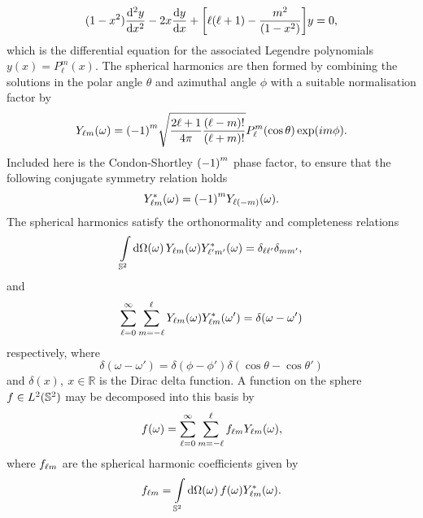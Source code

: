 %
\begin{equation}
	(1-x^{2}) \dv[2]{y}{x} - 2x\dv{y}{x} + \bigg[\ell(\ell+1) - \frac{m^{2}}{(1 - x^{2})}\bigg] y
	= 0,
\end{equation}
%
which is the differential equation for the associated Legendre polynomials \(y(x) = P^{m}_{\ell}(x)\).
The spherical harmonics are then formed by combining the solutions in the polar angle \(\theta{}\) and azimuthal angle \(\phi{}\) with a suitable normalisation factor by
%
\begin{equation}\label{eq:chapter2_spherical_harmonic}
	\pixel{\harmonic{Y}}
	= \phaseFactor \sqrt{\factor \frac{(\ell-m)!}{(\ell+m)!}} P^{m}_{\ell}(\cos{\theta}) \exp(i m\phi).
\end{equation}
%
Included here is the Condon-Shortley \(\phaseFactor{}\) phase factor, to ensure that the following conjugate symmetry relation holds
%
\begin{equation}\label{eq:chapter2_spherical_harmonic_phase}
	\pixel{\conj{\harmonic{Y}}}
	= \phaseFactor \pixel{Y_{\ell(-m)}}.
\end{equation}
%
The spherical harmonics satisfy the orthonormality and completeness relations
%
\begin{equation}\label{eq:chapter2_spherical_harmonics_orthonormal}
	\integrateSphere{\omega} \pixel{\harmonic{Y}} \pixel{\conj{\harmonic[']{Y}}}
	= \delta_{\ell\ell'} \delta_{mm'},
\end{equation}
%
and
%
\begin{equation}
	\sum\limits_{\ell=0}^{\infty} \sum\limits_{m=-\ell}^{\ell} \pixel{\harmonic{Y}} \pixel[']{\conj{\harmonic{Y}}}
	= \delta(\omega-\omega')
\end{equation}
%
respectively, where
%
\begin{equation}
	\delta(\omega-\omega')
	= \delta(\phi-\phi') \delta(\cos{\theta} - \cos{\theta'})
\end{equation}
%
and \(\delta(x),\ x \in \mathbb{R}\) is the Dirac delta function.
A function on the sphere \(f \in \hilbert{\twoSphere}\) may be decomposed into this basis by
%
\begin{equation}
	\pixel{f}
	= \sum\limits_{\ell=0}^{\infty} \sum\limits_{m=-\ell}^{\ell} \harmonic{f} \pixel{\harmonic{Y}},
\end{equation}
%
where \(\harmonic{f}\) are the spherical harmonic coefficients given by
%
\begin{equation}
	\harmonic{f}
	= \integrateSphere{\omega} \pixel{f} \pixel{\conj{\harmonic{Y}}}.
\end{equation}
